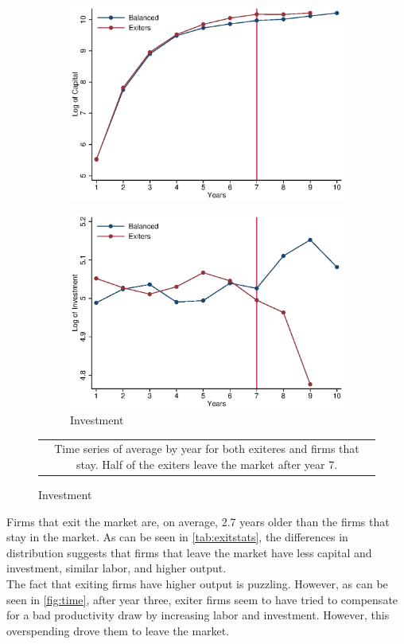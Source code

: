 \documentclass[11pt]{article}
\begin{document}
\begin{figure}[h!]
\begin{subfigure}[b]{.4\textwidth}
		\includegraphics[width=\textwidth]{out/timeK.eps}
	\end{subfigure}
	\begin{subfigure}[b]{.4\textwidth}
		\centering
		\caption{Investment}
		\includegraphics[width=\textwidth]{out/timeI.eps}
	\end{subfigure}
\begin{tabular*}{1\textwidth}{c}
	\multicolumn{1}{p{1\hsize}}{\footnotesize Time series of average by year for both exiteres and firms that stay. Half of the exiters leave the market after year 7.}\\
\end{tabular*}      	  
\end{figure}

Firms that exit the market are, on average, 2.7 years older than the firms that stay in the market. As can be seen in \autoref{tab:exitstats}, the differences in distribution suggests that firms that leave the market have less capital and investment, similar labor, and higher output. \\
The fact that exiting firms have higher output is puzzling. However, as can be seen in \autoref{fig:time}, after year three, exiter firms seem to have tried to compensate for a bad productivity draw by increasing labor and investment. However, this overspending drove them to leave the market.
\end{document}
